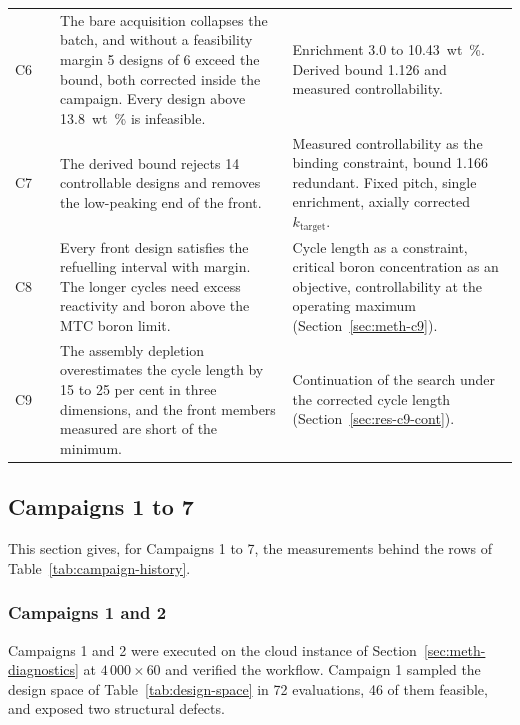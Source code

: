 \begin{table}[htbp]
\begin{tabularx}{\textwidth}{@{}>{\raggedright\arraybackslash}p{1.55cm}>{\centering\arraybackslash}p{1.85cm}>{\raggedright\arraybackslash}X>{\raggedright\arraybackslash}X@{}}
    \addlinespace[3pt]
    C6 & 114 &
      The bare acquisition collapses the batch, and without a feasibility margin 5 designs of 6 exceed the bound, both corrected inside the campaign. Every design above \SI{13.8}{wt\%} is infeasible. &
      Enrichment 3.0 to \SI{10.43}{wt\%}. Derived bound 1.126 and measured controllability. \\
    \addlinespace[3pt]
    C7 & 60 &
      The derived bound rejects 14 controllable designs and removes the low-peaking end of the front. &
      Measured controllability as the binding constraint, bound 1.166 redundant. Fixed pitch, single enrichment, axially corrected $k_\mathrm{target}$. \\
    \addlinespace[3pt]
    C8 & 60 &
      Every front design satisfies the refuelling interval with margin. The longer cycles need excess reactivity and boron above the MTC boron limit. &
      Cycle length as a constraint, critical boron concentration as an objective, controllability at the operating maximum (Section~\ref{sec:meth-c9}). \\
    \addlinespace[3pt]
    C9 & 60 &
      The assembly depletion overestimates the cycle length by 15 to 25 per cent in three dimensions, and the front members measured are short of the minimum. &
      Continuation of the search under the corrected cycle length (Section~\ref{sec:res-c9-cont}). \\
    \bottomrule
  \end{tabularx}
\end{table}

\subsection{Campaigns 1 to 7}
\label{sec:res-history}

This section gives, for Campaigns 1 to 7, the measurements behind the
rows of Table~\ref{tab:campaign-history}.

\subsubsection{Campaigns 1 and 2}
\label{sec:res-hist-c1c2}
\label{sec:res-c1c2}\label{sec:res-c1}\label{eq:depletion-horizon}\label{sec:res-c2}\label{fig:c2-space}\label{tab:c2-estimator}

Campaigns 1 and 2 were executed on the cloud instance of
Section~\ref{sec:meth-diagnostics} at $4\,000\times60$ and verified
the workflow. Campaign 1 sampled the design space of
Table~\ref{tab:design-space} in 72 evaluations, 46 of them feasible,
and exposed two structural defects.

